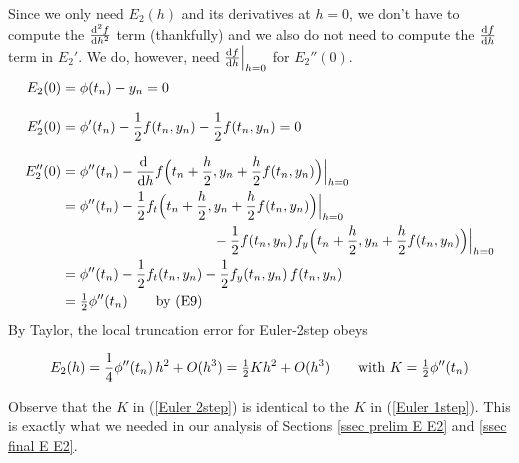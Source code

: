 Since we only need $E_2(h)$ and its derivatives at $h=0$, we don't have to compute the $\difftwo{f}{h}$ term (thankfully) and we also do not need to
compute the $\diff{f}{h}$ term in $E_2'$. We do, however, need  
$\diff{f}{h}\Big|_{h=0}$ for $E_2''(0)$.
\begin{align*}
E_2(0)&=\phi(t_n)-y_n=0 \\[0.1in]
E'_2(0)&=\phi'(t_n)-\frac{1}{2}f(t_n,y_n)-\frac{1}{2}f(t_n,y_n)=0 \\[0.1in]
E''_2(0)&=\phi''(t_n)-\diff{}{h}
f\Big(t_n+\frac{h}{2},y_n+\frac{h}{2}f(t_n,y_n)\Big)\Big|_{h=0} \\
&=\phi''(t_n)-
\frac{1}{2} f_t\Big(t_n+\frac{h}{2},y_n+\frac{h}{2}f(t_n,y_n)\Big)\Big|_{h=0} \\
&\hskip1.5in -\frac{1}{2} f(t_n,y_n)\, f_y\Big(t_n+\frac{h}{2},y_n+\frac{h}{2}f(t_n,y_n)\Big)\Big|_{h=0} \\
&=\phi''(t_n)- \frac{1}{2}f_t(t_n,y_n)-\frac{1}{2}f_y(t_n,y_n)\, f(t_n,y_n) \\
&=\half\phi''(t_n)\qquad\text{by (E9)}
\end{align*}
By Taylor, the local truncation error for Euler-2step obeys
\begin{impeqn}\label{Euler 2step}
\begin{equation*}
E_2(h)=\frac{1}{4}\phi''(t_n)\,h^2+O(h^3)
=\tfrac{1}{2} Kh^2+O(h^3)\qquad{\rm with\ }K=\tfrac{1}{2}\phi''(t_n)
\end{equation*}
\end{impeqn}\noindent
Observe that the $K$ in (\ref{Euler 2step}) is identical to the $K$ in 
(\ref{Euler 1step}). This is exactly what we needed in our analysis of 
Sections \ref{ssec prelim E E2} and \ref{ssec final E E2}.







